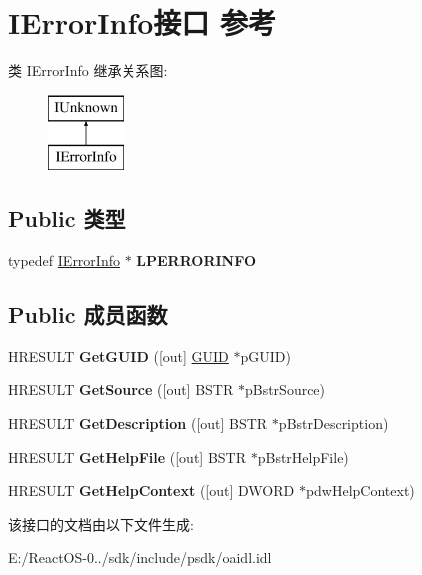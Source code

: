 \hypertarget{interface_i_error_info}{}\section{I\+Error\+Info接口 参考}
\label{interface_i_error_info}
类 I\+Error\+Info 继承关系图\+:\begin{figure}[H]
\begin{center}
\leavevmode
\includegraphics[height=2.000000cm]{interface_i_error_info}
\end{center}
\end{figure}
\subsection*{Public 类型}
\begin{DoxyCompactItemize}
\item 
\mbox{\label{interface_i_error_info_a4efd8db057c2dbc5259c829590f15b05}} 
typedef \hyperlink{interface_i_error_info}{I\+Error\+Info} $\ast$ {\bfseries L\+P\+E\+R\+R\+O\+R\+I\+N\+FO}
\end{DoxyCompactItemize}
\subsection*{Public 成员函数}
\begin{DoxyCompactItemize}
\item 
\mbox{\label{interface_i_error_info_af60d4d5802f9fab8f022c5a30f961c09}} 
H\+R\+E\+S\+U\+LT {\bfseries Get\+G\+U\+ID} (\mbox{[}out\mbox{]} \hyperlink{interface_g_u_i_d}{G\+U\+ID} $\ast$p\+G\+U\+ID)
\item 
\mbox{\label{interface_i_error_info_aa855ae4f4abd9181aca984f4d86d5213}} 
H\+R\+E\+S\+U\+LT {\bfseries Get\+Source} (\mbox{[}out\mbox{]} B\+S\+TR $\ast$p\+Bstr\+Source)
\item 
\mbox{\label{interface_i_error_info_a3ebf46647d1ad8c9ce27ca246430ee6e}} 
H\+R\+E\+S\+U\+LT {\bfseries Get\+Description} (\mbox{[}out\mbox{]} B\+S\+TR $\ast$p\+Bstr\+Description)
\item 
\mbox{\label{interface_i_error_info_aada7651f4e8a3ec9bb8275b1d1018e26}} 
H\+R\+E\+S\+U\+LT {\bfseries Get\+Help\+File} (\mbox{[}out\mbox{]} B\+S\+TR $\ast$p\+Bstr\+Help\+File)
\item 
\mbox{\label{interface_i_error_info_a0b973bc6053475bc272c13e3ee8c7731}} 
H\+R\+E\+S\+U\+LT {\bfseries Get\+Help\+Context} (\mbox{[}out\mbox{]} D\+W\+O\+RD $\ast$pdw\+Help\+Context)
\end{DoxyCompactItemize}


该接口的文档由以下文件生成\+:\begin{DoxyCompactItemize}
\item 
E\+:/\+React\+O\+S-\/0../sdk/include/psdk/oaidl.\+idl\end{DoxyCompactItemize}
